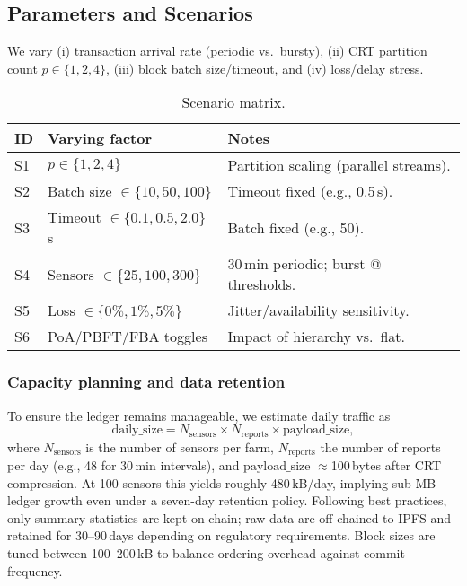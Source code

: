 \documentclass[12pt,onecolumn]{IEEEtran} %
\begin{document}
\subsection{Parameters and Scenarios}
We vary (i) transaction arrival rate (periodic vs.\ bursty), (ii) CRT partition count $p\in\{1,2,4\}$, (iii) block batch size/timeout, and (iv) loss/delay stress.

\begingroup
\setlength{\tabcolsep}{3pt}\footnotesize
\begin{table}[!t]
  \centering
  \caption{Scenario matrix.}
  \label{tab:scenarios-setup}
  \begin{tabularx}{\textwidth}{l l X}
    \toprule
    \textbf{ID} & \textbf{Varying factor} & \textbf{Notes} \\
    \midrule
    S1 & $p\in\{1,2,4\}$ & Partition scaling (parallel streams). \\
    S2 & Batch size $\in\{10,50,100\}$ & Timeout fixed (e.g., 0.5\,s). \\
    S3 & Timeout $\in\{0.1,0.5,2.0\}$\,s & Batch fixed (e.g., 50). \\
    S4 & Sensors $\in\{25,100,300\}$ & 30\,min periodic; burst @ thresholds. \\
    S5 & Loss $\in\{0\%,1\%,5\%\}$ & Jitter/availability sensitivity. \\
    S6 & PoA/PBFT/FBA toggles & Impact of hierarchy vs.\ flat. \\
    \bottomrule
  \end{tabularx}
\end{table}
\endgroup

\subsubsection{Capacity planning and data retention}
To ensure the ledger remains manageable, we estimate daily traffic as
\begin{equation}
  \text{daily\_size} = N_{\text{sensors}} \times N_{\text{reports}} \times \text{payload\_size},
\end{equation}
where $N_{\text{sensors}}$ is the number of sensors per farm, $N_{\text{reports}}$ the number of reports per day (e.g., 48 for 30\,min intervals), and $\text{payload\_size}$ $\approx$100\,bytes after CRT compression. At 100 sensors this yields roughly 480\,kB/day, implying sub-MB ledger growth even under a seven-day retention policy. Following best practices, only summary statistics are kept on-chain; raw data are off-chained to IPFS and retained for 30–90\,days depending on regulatory requirements. Block sizes are tuned between 100–200\,kB to balance ordering overhead against commit frequency.
\end{document}

